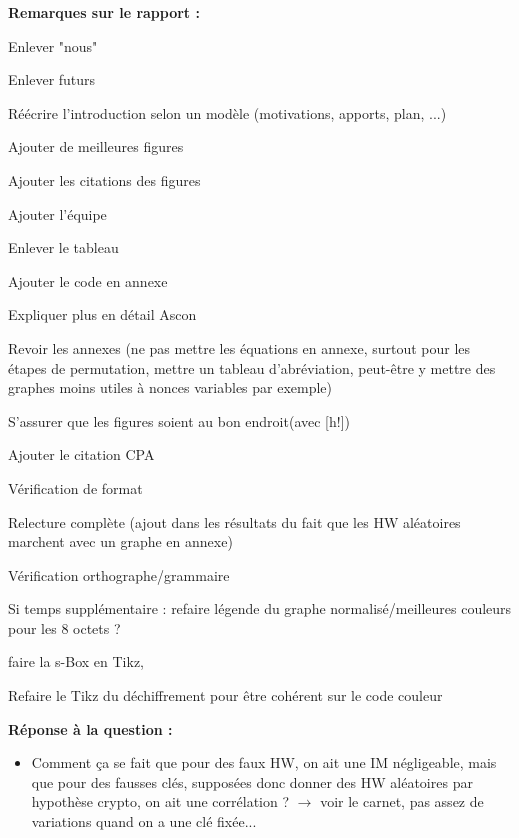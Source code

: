 \documentclass[12pt]{article}
\newcommand{\cmark}{\ding{51}}%
\newcommand{\done}{\rlap{$\square$}{\raisebox{2pt}{\large\hspace{1pt}\cmark}}%
	\hspace{-2.5pt}}
\begin{document}
	\noindent \textbf{Remarques sur le rapport :} 
	\begin{todolist}
		\item[\done] Enlever "nous"
		\item[\done] Enlever futurs
		\item[\done] Réécrire l'introduction selon un modèle (motivations, apports, plan, ...)
		\item[\done] Ajouter de meilleures figures
		\item[\done] Ajouter les citations des figures
		\item[\done] Ajouter l'équipe
		\item[\done] Enlever le tableau
		\item[\done] Ajouter le code en annexe
		\item[\done] Expliquer plus en détail Ascon
		\item[\done] Revoir les annexes (ne pas mettre les équations en annexe, surtout pour les étapes de permutation, mettre un tableau d'abréviation, peut-être y mettre des graphes moins utiles à nonces variables par exemple)
		\item[\done] S'assurer que les figures soient au bon endroit(avec [h!])
		\item[\done] Ajouter le citation CPA
		\item[\done] Vérification de format
		\item[\done] Relecture complète (ajout dans les résultats du fait que les HW aléatoires marchent avec un graphe en annexe)
		\item[\done] Vérification orthographe/grammaire
		\item Si temps supplémentaire : refaire légende du graphe normalisé/meilleures couleurs pour les 8 octets ?
		\item[\done] faire la s-Box en Tikz, 
		\item[\done] Refaire le Tikz du déchiffrement pour être cohérent sur le code couleur
	\end{todolist}
	
	\noindent \textbf{Réponse à la question :}
	\begin{itemize}
		\item Comment ça se fait que pour des faux HW, on ait une IM négligeable, mais que pour des fausses clés, supposées donc donner des HW aléatoires par hypothèse crypto, on ait une corrélation ? $\rightarrow$ voir le carnet, pas assez de variations quand on a une clé fixée...
	\end{itemize}
	
\end{document}
